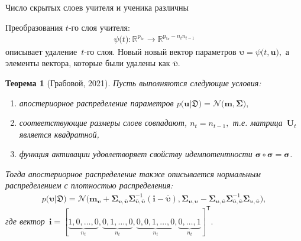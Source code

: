 \documentclass[10pt,pdf,hyperref={unicode}]{beamer}
\newtheorem{rustheorem}{Теорема}
\begin{document}

\begin{frame}{Число скрытых слоев учителя и ученика различны}

Преобразования $t$-го слоя учителя:
\[
\begin{aligned}
\psi\bigr(t\bigr) : \mathbb{R}^{\text{p}_{\text{tr}}} \to \mathbb{R}^{\text{p}_{\text{tr}}-n_tn_{t-1}}
\end{aligned}
\]
описывает удаление~$t$-го слоя. Новый новый вектор параметров $\bm{\upsilon} = \psi\bigr(t, \mathbf{u}\bigr),$ а элементы вектора, которые были удалены как $\bar{\bm{\upsilon}}.$

\begin{rustheorem}[Грабовой, 2021]
Пусть выполняются следующие условия:
\begin{enumerate}[1)]
\item апостериорное распределение параметров $p\bigr(\mathbf{u}|\mathfrak{D}\bigr) = \mathcal{N}\bigr(\mathbf{m}, \bm{\Sigma}\bigr),$
\item соответствующие размеры слоев совпадают, $n_t=n_{t-1},$ т.е. матрица~$\mathbf{U}_t$ является квадратной,
\item функция активации удовлетворяет свойству идемпотентности $\bm{\sigma} \circ \bm{\sigma} = \bm{\sigma}$.
\end{enumerate}
Тогда апостериорное распределение также описывается нормальным распределением с плотностью распределения:
\[
\label{eq:ap:5}
\begin{aligned}
p\bigr(\bm{\upsilon}|\mathfrak{D}\bigr) = \mathcal{N}\bigr(\mathbf{m}_{\bm{\upsilon}}+\bm{\Sigma}_{\bm{\upsilon},\bar{\bm{\upsilon}}} \bm{\Sigma}_{\bar{\bm{\upsilon}},\bar{\bm{\upsilon}}}^{-1} \left(\mathbf{i} - \bar{\bm{\upsilon}}\right), \bm{\Sigma}_{\bm{\upsilon},\bm{\upsilon}} - \bm{\Sigma}_{\bm{\upsilon},\bar{\bm{\upsilon}}}\bm{\Sigma}_{\bar{\bm{\upsilon}},\bar{\bm{\upsilon}}}^{-1}\bm{\Sigma}_{\bm{\upsilon},\bar{\bm{\upsilon}}}\bigr),
\end{aligned}
\]
где вектор~$
\mathbf{i}=[\underbrace{1, 0, \ldots, 0}_{n_t}, \underbrace{0, 1, \ldots, 0}_{n_t}, \underbrace{0, 0, 1, \ldots, 0}_{n_t}, \underbrace{0, \ldots, 1}_{n_t}]^{\mathsf{T}}.
$
\end{rustheorem}

\end{frame}
\end{document}
